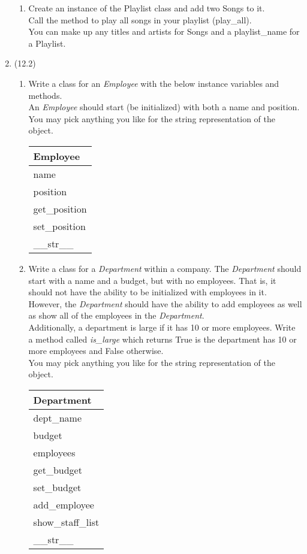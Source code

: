 \documentclass{article}
\begin{document}
\begin{enumerate}
\begin{enumerate}
		\item
			Create an instance of the Playlist class and add two Songs to it.\\
			Call the method to play all songs in your playlist (play\_all).\\
			You can make up any titles and artists for Songs and a playlist\_name for a Playlist.\\
	\end{enumerate}
\pagebreak


\item (12.2) 
	\begin{enumerate}
		\item 
			Write a class for an \textit{Employee} with the below instance variables and methods.\\
			An \textit{Employee} should start (be initialized) with both a name and position.\\
			You may pick anything you like for the string representation of the object.
			\begin{flushright}
			\begin{tabular}{|l|} \hline
				Employee\\ \hline
				name\\ position\\ \hline
				get\_position\\ set\_position\\ \_\_str\_\_ \\ \hline
			\end{tabular}
			\end{flushright}
		
		\item 
			Write a class for a \textit{Department} within a company. The \textit{Department} should 
			start with a name and a budget, but with no employees. That is, it should not have the ability to be
			initialized with employees in it. However, the \textit{Department} should have the ability to add 
			employees as well as show all of the employees in the \textit{Department}.\\
			Additionally, a department is large if it has 10 or more employees. Write a method called 
			\textit{is\_large} which returns True is the department has 10 or more employees and False otherwise.\\
			You may pick anything you like for the string representation of the object.
			\begin{flushright}
			\begin{tabular}{|l|} \hline 
				Department\\ \hline
				dept\_name\\ budget\\ employees\\ \hline
				get\_budget\\ set\_budget\\ add\_employee\\ show\_staff\_list\\ 
					\_\_str\_\_ \\ \hline
			\end{tabular}
			\end{flushright}


\end{enumerate}
\end{enumerate}
\end{document}
